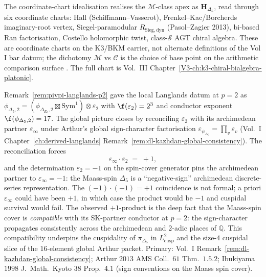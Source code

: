 \begin{remark}
\label{rem:pivpi-2}
The coordinate-chart idealisation realises the $\mathcal M$-class apex
as $\mathbf H_{\Delta_5}$, read through six coordinate charts: Hall
(Schiffmann--Vasserot), Frenkel--Kac/Borcherds imaginary-root vertex,
Siegel-paramodular $R_{\mathrm{Sieg,dyn}}$ (Pasol--Zagier 2013),
bi-based Ran factorisation, Costello holomorphic twist, class-$\mathcal S$
AGT chiral algebra. These are coordinate charts on the K3/BKM carrier,
not alternate definitions of the Vol I bar datum; the dichotomy
$\mathcal M$ vs $\mathcal C$ is the choice of base point on the
arithmetic comparison surface
\cite{SchiffmannVasserot2012,PasolZagier2013,CostelloHolomorphic,Gaiotto2009}.
The full chart is Vol.~III
Chapter~\ref{V3-ch:k3-chiral-bialgebra-platonic}.
\end{remark}

\begin{remark}[The $\varepsilon_2$-structure at $p = 2$ reconciled with the archimedean Maass-spin signature]
\label{rem:pivpi-eps2-arch-reconciliation}
Remark~\ref{rem:pivpi-langlands-p2} gave the local
Langlands datum at $p = 2$ as
$\phi_{\Delta_5, 2} = (\phi_{\Delta_{E_6}, 2} \boxtimes
\mathrm{Sym}^1)\otimes\varepsilon_2$ with
$\f(\varepsilon_2) = 2^3$ and conductor exponent
$\f(\phi_{\Delta_5, 2}) = 17$. The global picture closes by
reconciling $\varepsilon_2$ with its archimedean partner
$\varepsilon_\infty$ under Arthur's global sign-character
factorisation
$\varepsilon_{\psi_{\Delta_5}} = \prod_v \varepsilon_v$
(Vol.~I Chapter~\ref{ch:derived-langlands}
Remark~\ref{rem:dl-kazhdan-global-consistency}). The reconciliation
forces
\begin{equation}
\label{eq:pivpi-global-consistency}
 \varepsilon_\infty\cdot\varepsilon_2
 \;=\;
 +1,
\end{equation}
and the determination $\varepsilon_2 = -1$ on the spin-cover
generator pins the archimedean partner to
$\varepsilon_\infty = -1$: the Maass-spin $\Delta_5$ is a
``negative-sign'' archimedean discrete-series representation. The
$(-1)\cdot(-1) = +1$ coincidence is not formal; a priori
$\varepsilon_\infty$ could have been $+1$, in which case the product
would be $-1$ and cuspidal survival would fail. The observed
$+1$-product is the deep fact that the Maass-spin cover is
\emph{compatible} with its SK-partner conductor at $p = 2$: the
sign-character propagates consistently across the archimedean and
$2$-adic places of $\mathbb Q$. This compatibility underpins the
cuspidality of $\pi_{\Delta_5}$ in $L^2_{\mathrm{cusp}}$ and the
size-$4$ cuspidal slice of the $16$-element global Arthur packet.
Primary: Vol.~I
Remark~\ref{rem:dl-kazhdan-global-consistency};
Arthur $2013$ AMS Coll.~$61$ Thm.\ $1.5.2$;
Ibukiyama $1998$ J.\ Math.\ Kyoto $38$ Prop.\ 4.1 (sign conventions on
the Maass spin cover).
\end{remark}

